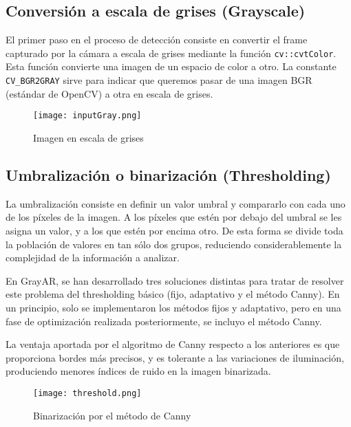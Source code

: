 \subsection{Conversión a escala de grises (Grayscale)}
El primer paso en el proceso de detección consiste en convertir el frame capturado por la cámara a escala de grises mediante la función \texttt{cv::cvtColor}. Esta función convierte una imagen de un espacio de color a otro. La constante \texttt{CV\_BGR2GRAY} sirve para indicar que queremos pasar de una imagen BGR (estándar de OpenCV) a otra en escala de grises.

\begin{figure}[h] 
  \centering
  \texttt{[image: inputGray.png]}
  \caption{Imagen en escala de grises}
  \label{fig:grayscale}
\end{figure}


\subsection{Umbralización o binarización (Thresholding)}
La umbralización consiste en definir un valor umbral y compararlo con cada uno de los píxeles de la imagen. A los píxeles que estén por debajo del umbral se les asigna un valor, y a los que estén por encima otro. De esta forma se divide toda la población de valores en tan sólo dos grupos, reduciendo considerablemente la complejidad de la información a analizar.

En GrayAR, se han desarrollado tres soluciones distintas para tratar de resolver este problema del thresholding básico (fijo, adaptativo y el método Canny). En un principio, solo se implementaron los métodos fijos y adaptativo, pero en una fase de optimización realizada posteriormente, se incluyo
el método Canny. 

La ventaja aportada por el algoritmo de Canny respecto a los anteriores es que proporciona bordes más precisos, y es tolerante a las variaciones de iluminación, produciendo menores índices de ruido en la imagen binarizada.

\begin{figure}[h] 
  \centering
  \texttt{[image: threshold.png]}
  \caption{Binarización por el método de Canny}
  \label{fig:binarizacion}
\end{figure}


